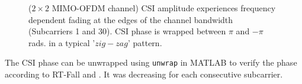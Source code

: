 \begin{figure}[H]%
    \centering
    \qquad
    \caption{($2\times 2$ MIMO-OFDM channel) CSI amplitude experiences frequency dependent fading at the edges of the channel bandwidth (Subcarriers 1 and 30). CSI phase is wrapped between $\pi$ and $-\pi$ rads. in a typical '$zig-zag$' pattern.}%
    \label{fig:CSIAMPLITUDE&PHASE}%
\end{figure}
The CSI phase can be unwrapped using \lstinline{unwrap} in MATLAB to verify the phase according to RT-Fall and \cite{perceivingAccurateCSI}. It was decreasing for each consecutive subcarrier.
